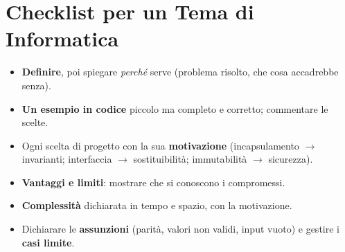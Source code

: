 \section{Checklist per un Tema di Informatica}
\begin{itemize}
    \item \textbf{Definire}, poi spiegare \emph{perché} serve (problema risolto, che cosa accadrebbe senza).
    \item \textbf{Un esempio in codice} piccolo ma completo e corretto; commentare le scelte.
    \item Ogni scelta di progetto con la sua \textbf{motivazione} (incapsulamento $\to$ invarianti; interfaccia $\to$ sostituibilità; immutabilità $\to$ sicurezza).
    \item \textbf{Vantaggi e limiti}: mostrare che si conoscono i compromessi.
    \item \textbf{Complessità} dichiarata in tempo e spazio, con la motivazione.
    \item Dichiarare le \textbf{assunzioni} (parità, valori non validi, input vuoto) e gestire i \textbf{casi limite}.
\end{itemize}
